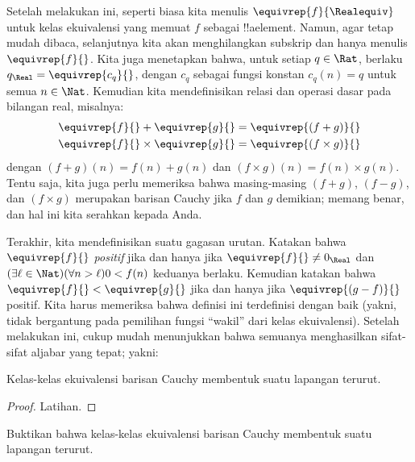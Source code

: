 \documentclass[../../../include/open-logic-section]{subfiles}
\begin{document}
Setelah melakukan ini, seperti biasa kita menulis
$\equivrep{f}{\Realequiv}$ untuk kelas ekuivalensi yang memuat $f$ sebagai
!!a{element}. Namun, agar tetap mudah dibaca, selanjutnya kita akan
menghilangkan subskrip dan hanya menulis $\equivrep{f}{}$. Kita juga
menetapkan bahwa, untuk setiap $q \in \Rat$, berlaku $q_{\Real} =
\equivrep{c_{q}}{}$, dengan $c_{q}$ sebagai fungsi konstan $c_q(n) = q$ untuk
semua $n \in \Nat$. Kemudian kita mendefinisikan relasi dan operasi dasar pada
bilangan real, misalnya:
\begin{align*}
	\equivrep{f}{} + \equivrep{g}{} &= 	\equivrep{(f + g)}{} \\
	\equivrep{f}{} \times 	\equivrep{g}{} &= \equivrep{(f \times g)}{} 
\end{align*}
dengan $(f + g)(n) = f(n) + g(n)$ dan $(f \times g)(n) = f(n) \times
g(n)$. Tentu saja, kita juga perlu memeriksa bahwa masing-masing $(f + g)$,
$(f-g)$, dan $(f\times g)$ merupakan barisan Cauchy jika $f$ dan $g$ demikian;
memang benar, dan hal ini kita serahkan kepada Anda.

Terakhir, kita mendefinisikan suatu gagasan urutan. Katakan bahwa
$\equivrep{f}{}$ \emph{positif} jika dan hanya jika
$\equivrep{f}{}\neq 0_\Real$ dan $(\exists \ell \in \Nat)(\forall n >
\ell)0 < f(n)$ keduanya berlaku. Kemudian katakan bahwa $\equivrep{f}{} <
\equivrep{g}{}$ jika dan hanya jika $\equivrep{(g - f)}{}$ positif. Kita harus
memeriksa bahwa definisi ini terdefinisi dengan baik (yakni, tidak bergantung
pada pemilihan fungsi ``wakil'' dari kelas ekuivalensi).
Setelah melakukan ini, cukup mudah menunjukkan bahwa semuanya menghasilkan
sifat-sifat aljabar yang tepat; yakni:
\begin{thm}
Kelas-kelas ekuivalensi barisan Cauchy membentuk suatu lapangan terurut.
\end{thm}

\begin{proof}
Latihan.
\end{proof}

\begin{prob}
Buktikan bahwa kelas-kelas ekuivalensi barisan Cauchy membentuk suatu lapangan terurut.
\end{prob}
\end{document}
